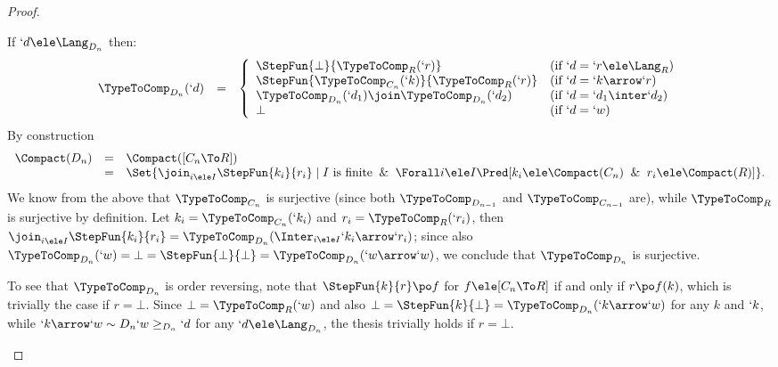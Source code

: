 \documentclass{CSML}
\begin{document}
\begin{proof}
\begin{description}
If $`d \ele \Lang_{D_n}$ then:
%
 \[ \begin{array}{rcl}
\TypeToComp_{D_n}(`d) 
	&=& 
\left \{
 \begin{array}{ll}
\StepFun{\bot }{ \TypeToComp_R(`r)} & (\textrm{if }`d = `r \ele \Lang_R) \\
\StepFun{\TypeToComp_{C_n}(`k) }{ \TypeToComp_R(`r)} & (\textrm{if }`d = `k\arrow `r ) \\ 
\TypeToComp_{D_n}(`d_1)\join \TypeToComp_{D_n}(`d_2) & (\textrm{if }`d = `d_1\inter `d_2) \\ 
\bot & (\textrm{if }`d = `w)
 \end{array} \right.
 \end{array} \]
By construction 
%
 \[ \begin{array}{rcl}
\Compact(D_{n}) 
	&=& 
\Compact([C_n \To R]) \\
	&=& \Set{\join_{i \ele I} \StepFun{k_i }{ r_i} \mid I \textrm{ is finite} \And \Forall i \ele I \Pred[ k_i \ele \Compact(C_n) \And r_i \ele \Compact(R) ] }.
 \end{array} \] 
We know from the above that $\TypeToComp_{C_n}$ is surjective (since both $\TypeToComp_{D_{n{-}1}}$ and $\TypeToComp_{C_{n{-}1}}$ are), while $\TypeToComp_R$ is surjective by definition. 
Let $k_i = \TypeToComp_{C_n}(`k_i)$ and $r_i = \TypeToComp_R(`r_i)$, then
$\join_{i \ele I} \StepFun{k_i }{ r_i} = \TypeToComp_{D_n}(\Inter_{i \ele I} `k_i\arrow `r_i)$; since also $ \TypeToComp_{D_n}(`w) = \bot = \StepFun{\bot }{ \bot} = \TypeToComp_{D_n}(`w\arrow `w)$, we conclude that $\TypeToComp_{D_n}$ is surjective.

To see that $\TypeToComp_{D_n}$ is order reversing, note that $\StepFun{k }{ r} \po f$ for $f \ele [C_n \To R]$ if and only if $r \po f(k)$, which is trivially the case if $r = \bot$. Since $\bot = \TypeToComp_R(`w)$ and also $\bot = \StepFun{k }{ \bot} = \TypeToComp_{D_n}(`k\arrow `w)$ for any $k$ and $`k$, while $`k\arrow `w \sim{D_n} `w \geq_{D_n}`d$ for any $`d \ele \Lang_{D_n}$, the thesis trivially holds if $r = \bot$.


\end{description}
\end{proof}
\end{document}
